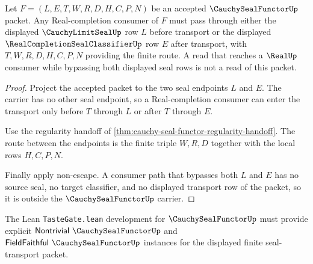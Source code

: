 \begin{theorem}
\label{thm:cauchy-seal-functor-real-completion-boundary}
Let $F=(L,E,T,W,R,D,H,C,P,N)$ be an accepted $\CauchySealFunctorUp$ packet. Any Real-completion consumer of $F$ must pass through either the displayed $\CauchyLimitSealUp$ row $L$ before transport or the displayed $\RealCompletionSealClassifierUp$ row $E$ after transport, with $T,W,R,D,H,C,P,N$ providing the finite route. A read that reaches a $\RealUp$ consumer while bypassing both displayed seal rows is not a read of this packet.
\end{theorem}
\begin{proof}
Project the accepted packet to the two seal endpoints $L$ and $E$. The carrier has no other seal endpoint, so a Real-completion consumer can enter the transport only before $T$ through $L$ or after $T$ through $E$.

Use the regularity handoff of \autoref{thm:cauchy-seal-functor-regularity-handoff}. The route between the endpoints is the finite triple $W,R,D$ together with the local rows $H,C,P,N$.

Finally apply non-escape. A consumer path that bypasses both $L$ and $E$ has no source seal, no target classifier, and no displayed transport row of the packet, so it is outside the $\CauchySealFunctorUp$ carrier.
\end{proof}

The Lean \texttt{TasteGate.lean} development for $\CauchySealFunctorUp$ must provide explicit $\mathsf{Nontrivial}\ \CauchySealFunctorUp$ and $\mathsf{FieldFaithful}\ \CauchySealFunctorUp$ instances for the displayed finite seal-transport packet.


\begin{closurestatus}{\CauchySealFunctorUp}
  \theoryclosure{\seedClosure}
  \formalstatus{\unformalizedV}
\end{closurestatus}
